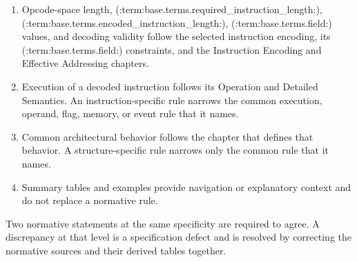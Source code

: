 \begin{enumerate}
\item Opcode-space length, (:term:base.terms.required_instruction_length:), (:term:base.terms.encoded_instruction_length:), (:term:base.terms.field:) values, and decoding validity follow the selected instruction encoding, its
(:term:base.terms.field:) constraints, and the Instruction Encoding and Effective Addressing chapters.
\item Execution of a decoded instruction follows its Operation and Detailed Semantics. An instruction-specific rule
narrows the common execution, operand, flag, memory, or event rule that it names.
\item Common architectural behavior follows the chapter that defines that behavior. A structure-specific rule
narrows only the common rule that it names.
\item Summary tables and examples provide navigation or explanatory context
and do not replace a normative rule.
\end{enumerate}

Two normative statements at the same specificity are required to agree. A discrepancy at that level is a
specification defect and is resolved by correcting the normative sources and their derived tables together.

